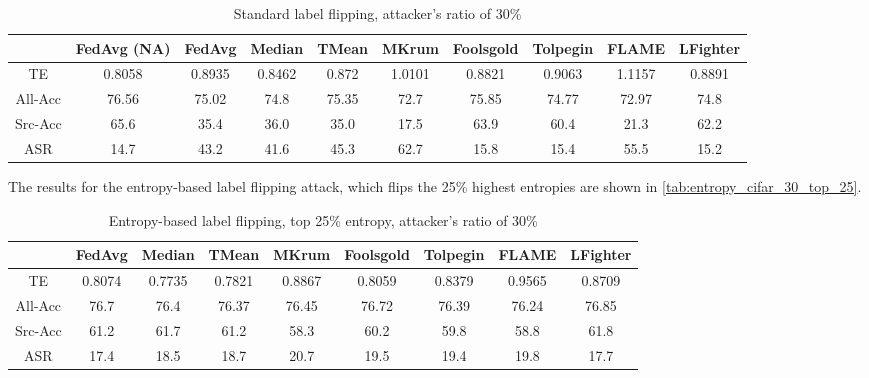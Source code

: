 \begin{table}[h!]
        \centering
        \small
        \begin{adjustbox}{center}
        \begin{tabular}{|c|c|c|c|c|c|c|c|c|c|}
            \hline
            & FedAvg (NA) & FedAvg & Median & TMean & MKrum & Foolsgold & Tolpegin & FLAME & LFighter \\
            \hline
            TE & 0.8058 & 0.8935 & 0.8462 & 0.872 & 1.0101 & 0.8821 & 0.9063 & 1.1157 & 0.8891 \\
            \hline
            All-Acc & 76.56 & 75.02 & 74.8 & 75.35 & 72.7 & 75.85 & 74.77 & 72.97 & 74.8 \\
            \hline
            Src-Acc & 65.6 & 35.4 & 36.0 & 35.0 & 17.5 & 63.9 & 60.4 & 21.3 & 62.2 \\
            \hline
            ASR & 14.7 & 43.2 & 41.6 & 45.3 & 62.7 & 15.8 & 15.4 & 55.5 & 15.2 \\
            \hline
        \end{tabular}
        \end{adjustbox}
        \caption{Standard label flipping, attacker's ratio of 30\%}
        \label{tab:standard_cifar_30}
\end{table}

The results for the entropy-based label flipping attack, which flips the 25\% highest entropies are shown in \autoref{tab:entropy_cifar_30_top_25}.

\begin{table}[h!]
        \centering
        \small
        \begin{adjustbox}{center}
        \begin{tabular}{|c|c|c|c|c|c|c|c|c|}
            \hline
            & FedAvg & Median & TMean & MKrum & Foolsgold & Tolpegin & FLAME & LFighter \\
            \hline
            TE & 0.8074 & 0.7735 & 0.7821 & 0.8867 & 0.8059 & 0.8379 & 0.9565 & 0.8709 \\
            \hline
            All-Acc & 76.7 & 76.4 & 76.37 & 76.45 & 76.72 & 76.39 & 76.24 & 76.85 \\
            \hline
            Src-Acc & 61.2 & 61.7 & 61.2 & 58.3 & 60.2 & 59.8 & 58.8 & 61.8 \\
            \hline
            ASR & 17.4 & 18.5 & 18.7 & 20.7 & 19.5 & 19.4 & 19.8 & 17.7 \\
            \hline
        \end{tabular}
        \end{adjustbox}
        \caption{Entropy-based label flipping, top 25\% entropy, attacker's ratio of 30\%}
        \label{tab:entropy_cifar_30_top_25}
    \end{table}
    
